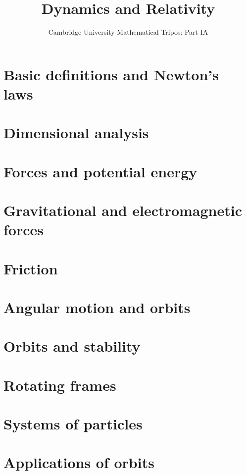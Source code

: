 \documentclass{article}
\title{Dynamics and Relativity}
\author{Cambridge University Mathematical Tripos: Part IA}
\begin{document}
\maketitle

\tableofcontentsnewpage{}

\section{Basic definitions and Newton's laws}

\section{Dimensional analysis}

\section{Forces and potential energy}

\section{Gravitational and electromagnetic forces}

\section{Friction}

\section{Angular motion and orbits}

\section{Orbits and stability}

\section{Rotating frames}

\section{Systems of particles}

\section{Applications of orbits}

\end{document}
